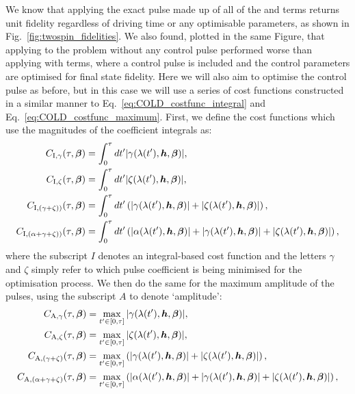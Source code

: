 We know that applying the exact  pulse made up of all of the  and   terms returns unit fidelity regardless of driving time or any optimisable parameters, as shown in Fig.~\ref{fig:twospin_fidelities}. We also found, plotted in the same Figure, that applying   to the problem without any control pulse performed worse than applying  with  terms, where a control pulse is included and the control parameters are optimised for final state fidelity. Here we will also aim to optimise the control pulse as before, but in this case we will use a series of cost functions constructed in a similar manner to Eq.~\eqref{eq:COLD_costfunc_integral} and Eq.~\eqref{eq:COLD_costfunc_maximum}. First, we define the cost functions which use the magnitudes of the coefficient integrals as:
 \begin{equation}\label{eq:twospin_costfunc_int}
    \begin{aligned}
        C_{\rm I, \gamma}(\tau, \boldsymbol{\beta}) &= \int_{0}^{\tau} dt^{\prime} |\gamma(\lambda(t^{\prime}), \boldsymbol{h}, \boldsymbol{\beta})|,\\
        C_{\rm I, \zeta}(\tau, \boldsymbol{\beta}) &= \int_{0}^{\tau} dt^{\prime} |\zeta(\lambda(t^{\prime}), \boldsymbol{h}, \boldsymbol{\beta})|,\\
        C_{\rm I, (\gamma + \zeta))}(\tau, \boldsymbol{\beta}) &= \int_{0}^{\tau} dt^{\prime} \left(|\gamma(\lambda(t^{\prime}), \boldsymbol{h}, \boldsymbol{\beta})| + |\zeta(\lambda(t^{\prime}), \boldsymbol{h}, \boldsymbol{\beta})|\right), \\
        C_{\rm I, (\alpha + \gamma + \zeta))}(\tau, \boldsymbol{\beta}) &= \int_{0}^{\tau} dt^{\prime} \left(|\alpha(\lambda(t^{\prime}), \boldsymbol{h}, \boldsymbol{\beta})| + |\gamma(\lambda(t^{\prime}), \boldsymbol{h}, \boldsymbol{\beta})| + |\zeta(\lambda(t^{\prime}), \boldsymbol{h}, \boldsymbol{\beta})|\right),
    \end{aligned}
\end{equation}
where the subscript $I$ denotes an integral-based cost function and the letters $\gamma$ and $\zeta$ simply refer to which pulse coefficient is being minimised for the optimisation process. We then do the same for the maximum amplitude of the pulses, using the subscript $A$ to denote `amplitude':
\begin{equation}\label{eq:twospin_costfunc_amp}
    \begin{aligned}
        C_{\rm A, \gamma}(\tau, \boldsymbol{\beta}) &= \max_{t^{\prime} \in [0,\tau]} | \gamma(\lambda(t^{\prime}), \boldsymbol{h}, \boldsymbol{\beta})|,\\
        C_{\rm A, \zeta}(\tau, \boldsymbol{\beta}) &= \max_{t^{\prime} \in [0,\tau]} | \zeta(\lambda(t^{\prime}), \boldsymbol{h}, \boldsymbol{\beta})|,\\
        C_{\rm A, (\gamma + \zeta)}(\tau, \boldsymbol{\beta}) &= \max_{t^{\prime} \in [0,\tau]} \left(| \gamma(\lambda(t^{\prime}), \boldsymbol{h}, \boldsymbol{\beta})| + |\zeta(\lambda(t^{\prime}), \boldsymbol{h}, \boldsymbol{\beta})| \right),\\
        C_{\rm A, (\alpha + \gamma + \zeta)}(\tau, \boldsymbol{\beta}) &= \max_{t^{\prime} \in [0,\tau]} \left(| \alpha(\lambda(t^{\prime}), \boldsymbol{h}, \boldsymbol{\beta})| + |\gamma(\lambda(t^{\prime}), \boldsymbol{h}, \boldsymbol{\beta})| + |\zeta(\lambda(t^{\prime}), \boldsymbol{h}, \boldsymbol{\beta})| \right),
    \end{aligned}
\end{equation}
